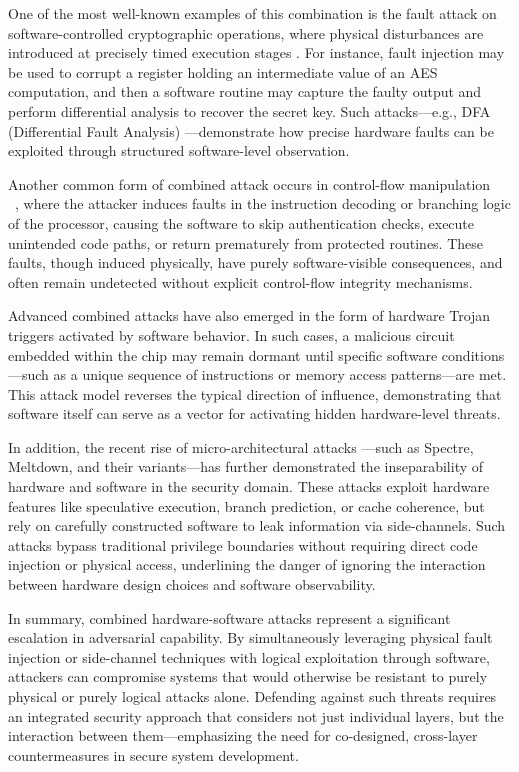 One of the most well-known examples of this combination is the fault attack on software-controlled cryptographic operations, where physical disturbances are introduced at precisely timed execution stages \cite{buhren2021one}. For instance, fault injection may be used to corrupt a register holding an intermediate value of an AES computation, and then a software routine may capture the faulty output and perform differential analysis to recover the secret key. Such attacks—e.g., DFA (Differential Fault Analysis) \cite{biham1997differential} —demonstrate how precise hardware faults can be exploited through structured software-level observation.

Another common form of combined attack occurs in control-flow manipulation ~\cite{carlini2015control} ~\cite{bouffard2011combined}, where the attacker induces faults in the instruction decoding or branching logic of the processor, causing the software to skip authentication checks, execute unintended code paths, or return prematurely from protected routines. These faults, though induced physically, have purely software-visible consequences, and often remain undetected without explicit control-flow integrity mechanisms.

Advanced combined attacks have also emerged in the form of hardware Trojan ~\cite{chakraborty2009hardware} triggers activated by software behavior. In such cases, a malicious circuit embedded within the chip may remain dormant until specific software conditions—such as a unique sequence of instructions or memory access patterns—are met. This attack model reverses the typical direction of influence, demonstrating that software itself can serve as a vector for activating hidden hardware-level threats.

In addition, the recent rise of micro-architectural attacks \cite{8740838}—such as Spectre, Meltdown, and their variants—has further demonstrated the inseparability of hardware and software in the security domain. These attacks exploit hardware features like speculative execution, branch prediction, or cache coherence, but rely on carefully constructed software to leak information via side-channels. Such attacks bypass traditional privilege boundaries without requiring direct code injection or physical access, underlining the danger of ignoring the interaction between hardware design choices and software observability.

In summary, combined hardware-software attacks represent a significant escalation in adversarial capability. By simultaneously leveraging physical fault injection or side-channel techniques with logical exploitation through software, attackers can compromise systems that would otherwise be resistant to purely physical or purely logical attacks alone. Defending against such threats requires an integrated security approach that considers not just individual layers, but the interaction between them—emphasizing the need for co-designed, cross-layer countermeasures in secure system development.

